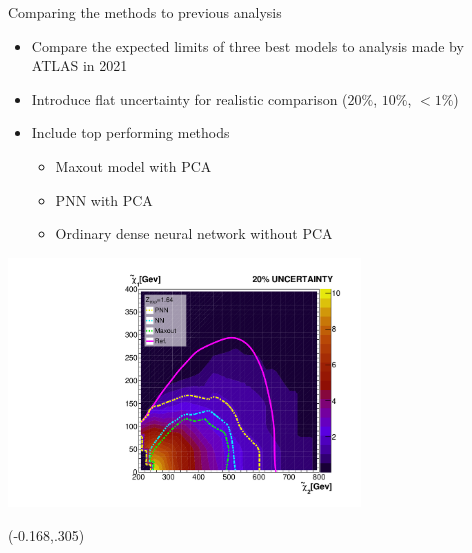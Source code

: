 \documentclass[UKenglish]{beamer}
\begin{document}
\begin{frame}{Comparing the methods to previous analysis}
    \begin{itemize}
        \item Compare the expected limits of three best models
              to analysis made by ATLAS in 2021 \cite{atlas_search_2021}
        \item Introduce flat uncertainty for realistic comparison ($20\%$, $10\%$, $<1\%$) 
        \item Include top performing methods
        \begin{itemize}
            \item Maxout model with PCA
            \item PNN with PCA
            \item Ordinary dense neural network without PCA
        \end{itemize}
    \end{itemize}
\end{frame}
\begin{frame}
    \centering
    \includegraphics[width=0.7\textwidth]{figures/Limits/compLimit20.pdf}
    \begin{textblock}{1}(-0.168,.305)
        \scriptsize
        \cite{atlas_search_2021}
    \end{textblock}
\end{frame}
\end{document}
